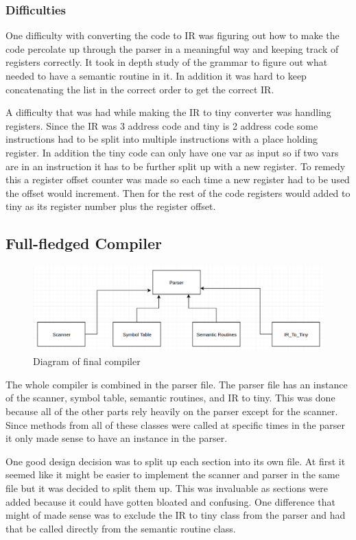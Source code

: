 \documentclass[12pt, oneside]{article}   	%
\begin{document}
\subsubsection{Difficulties}
	One difficulty with converting the code to IR was figuring out how to make the code percolate up through the parser in a meaningful way and keeping track of registers correctly. It took in depth study of the grammar to figure out what needed to have a semantic routine in it. In addition it was hard to keep concatenating the list in the correct order to get the correct IR.
	
	A difficulty that was had while making the IR to tiny converter was handling registers. Since the IR was 3 address code and tiny is 2 address code some instructions had to be split into multiple instructions with a place holding register. In addition the tiny code can only have one var as input so if two vars are in an instruction it has to be further split up with a new register. To remedy this a register offset counter was made so each time a new register had to be used the offset would increment. Then for the rest of the code registers would added to tiny as its register number plus the register offset.

\subsection{Full-fledged Compiler}
	\begin{figure}[h!]
		\centerline{\includegraphics[width=.4\linewidth]{pics/uml}}
		\caption{Diagram of final compiler}
	\end{figure}
	
The whole compiler is combined in the parser file. The parser file has an instance of the scanner, symbol table, semantic routines, and IR to tiny. This was done because all of the other parts rely heavily on the parser except for the scanner. Since methods from all of these classes were called at specific times in the parser it only made sense to have an instance in the parser.

One good design decision was to split up each section into its own file. At first it seemed like it might be easier to implement the scanner and parser in the same file but it was decided to split them up. This was invaluable as sections were added because it could have gotten bloated and confusing. One difference that might of made sense was to exclude the IR to tiny class from the parser and had that be called directly from the semantic routine class.
\end{document}
